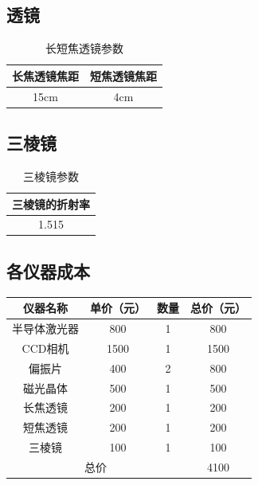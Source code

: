 \documentclass[12pt]{ctexart}
\numberwithin{equation}{section} %
\begin{document}
\subsection{透镜}
\begin{table}[H]
    \centering
    \caption{长短焦透镜参数}
    \begin{tabular}{cc}
    \toprule
    \textbf{长焦透镜焦距} & \textbf{短焦透镜焦距}\\
    \midrule
    15cm & 4cm\\
    \bottomrule
    \end{tabular}
\end{table}
\subsection{三棱镜}
\begin{table}[H]
    \centering
    \caption{三棱镜参数}
    \begin{tabular}{c}
    \toprule
    \textbf{三棱镜的折射率} \\
    \midrule
    1.515\\
    \bottomrule
    \end{tabular}
\end{table}
\subsection{各仪器成本}
\begin{table}[H]
    \centering
    \begin{tabular}{|c|c|c|c|}
    \hline
    \multicolumn{1}{|c|}{仪器名称}   & \multicolumn{1}{c|}{单价（元）} & 数量 & 总价（元） \\ \hline
    \multicolumn{1}{|c|}{半导体激光器} & \multicolumn{1}{c|}{800}   & 1  & 800   \\ \hline
    \multicolumn{1}{|c|}{CCD相机}  & \multicolumn{1}{c|}{1500}  & 1  & 1500  \\ \hline
    \multicolumn{1}{|c|}{偏振片}    & \multicolumn{1}{c|}{400}   & 2  & 800   \\ \hline
    \multicolumn{1}{|c|}{磁光晶体}   & \multicolumn{1}{c|}{500}   & 1  & 500   \\ \hline
    \multicolumn{1}{|c|}{长焦透镜}   & \multicolumn{1}{c|}{200}   & 1  & 200   \\ \hline
    \multicolumn{1}{|c|}{短焦透镜}   & \multicolumn{1}{c|}{200}   & 1  & 200   \\ \hline
    \multicolumn{1}{|c|}{三棱镜}    & \multicolumn{1}{c|}{100}   & 1  & 100   \\ \hline
    \multicolumn{3}{|c|}{总价}                                       & 4100  \\ \hline
    \end{tabular}
\end{table}
\end{document}
